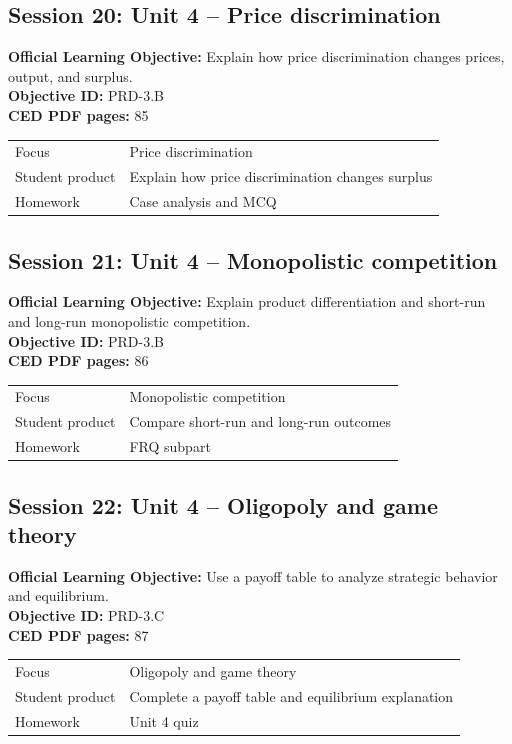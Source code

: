 \documentclass[11pt,a4paper]{article}
\newcommand{\objectivebox}[1]{\noindent\colorbox{aplight}{\parbox{0.96\textwidth}{#1}}}
\begin{document}
\subsection{Session 20: Unit 4 -- Price discrimination}
\objectivebox{\textbf{Official Learning Objective:} Explain how price discrimination changes prices, output, and surplus.\\\textbf{Objective ID:} PRD-3.B\\\textbf{CED PDF pages:} 85}\par\vspace{0.4em}
\begin{tabularx}{\textwidth}{p{3.0cm}Y}
\toprule
Focus & Price discrimination\\
Student product & Explain how price discrimination changes surplus\\
Homework & Case analysis and MCQ\\
\bottomrule
\end{tabularx}
\subsection{Session 21: Unit 4 -- Monopolistic competition}
\objectivebox{\textbf{Official Learning Objective:} Explain product differentiation and short-run and long-run monopolistic competition.\\\textbf{Objective ID:} PRD-3.B\\\textbf{CED PDF pages:} 86}\par\vspace{0.4em}
\begin{tabularx}{\textwidth}{p{3.0cm}Y}
\toprule
Focus & Monopolistic competition\\
Student product & Compare short-run and long-run outcomes\\
Homework & FRQ subpart\\
\bottomrule
\end{tabularx}
\subsection{Session 22: Unit 4 -- Oligopoly and game theory}
\objectivebox{\textbf{Official Learning Objective:} Use a payoff table to analyze strategic behavior and equilibrium.\\\textbf{Objective ID:} PRD-3.C\\\textbf{CED PDF pages:} 87}\par\vspace{0.4em}
\begin{tabularx}{\textwidth}{p{3.0cm}Y}
\toprule
Focus & Oligopoly and game theory\\
Student product & Complete a payoff table and equilibrium explanation\\
Homework & Unit 4 quiz\\
\bottomrule
\end{tabularx}
\end{document}

